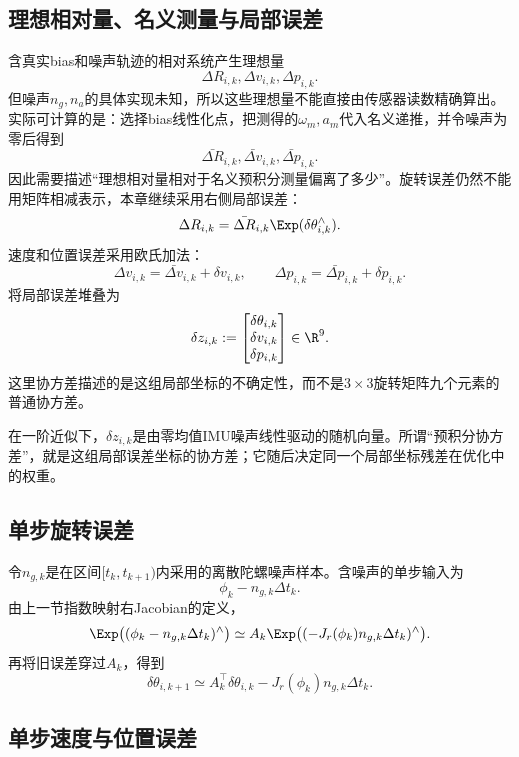 \subsection{理想相对量、名义测量与局部误差}

含真实bias和噪声轨迹的相对系统产生理想量
\[
    \Delta R_{i,k},\Delta v_{i,k},\Delta p_{i,k}.
\]
但噪声$n_g,n_a$的具体实现未知，所以这些理想量不能直接由传感器读数精确算出。实际可计算的是：选择bias线性化点，把测得的$\omega_m,a_m$代入名义递推，并令噪声为零后得到
\[
    \bar{\Delta R}_{i,k},
    \bar{\Delta v}_{i,k},
    \bar{\Delta p}_{i,k}.
\]
因此需要描述“理想相对量相对于名义预积分测量偏离了多少”。旋转误差仍然不能用矩阵相减表示，本章继续采用右侧局部误差：
\[
    \Delta R_{i,k}
    =\bar{\Delta R}_{i,k}\Exp(\delta\theta_{i,k}^\wedge).
\]
速度和位置误差采用欧氏加法：
\[
    \Delta v_{i,k}
    =\bar{\Delta v}_{i,k}+\delta v_{i,k},
    \qquad
    \Delta p_{i,k}
    =\bar{\Delta p}_{i,k}+\delta p_{i,k}.
\]
将局部误差堆叠为
\[
    \delta z_{i,k}
    :=
    \begin{bmatrix}
        \delta\theta_{i,k}\\
        \delta v_{i,k}\\
        \delta p_{i,k}
    \end{bmatrix}
    \in\R^9.
\]
这里协方差描述的是这组局部坐标的不确定性，而不是$3\times3$旋转矩阵九个元素的普通协方差。

在一阶近似下，$\delta z_{i,k}$是由零均值IMU噪声线性驱动的随机向量。所谓“预积分协方差”，就是这组局部误差坐标的协方差；它随后决定同一个局部坐标残差在优化中的权重。

\subsection{单步旋转误差}

令$n_{g,k}$是在区间$[t_k,t_{k+1})$内采用的离散陀螺噪声样本。含噪声的单步输入为
\[
    \phi_k-n_{g,k}\Delta t_k.
\]
由上一节指数映射右Jacobian的定义，
\[
    \Exp\bigl((\phi_k-n_{g,k}\Delta t_k)^\wedge\bigr)
    \simeq
    A_k\Exp\bigl((-J_r(\phi_k)n_{g,k}\Delta t_k)^\wedge\bigr).
\]
再将旧误差穿过$A_k$，得到
\[
\boxed{
    \delta\theta_{i,k+1}
    \simeq
    A_k^\top\delta\theta_{i,k}
    -J_r(\phi_k)n_{g,k}\Delta t_k.
}
\]

\subsection{单步速度与位置误差}

